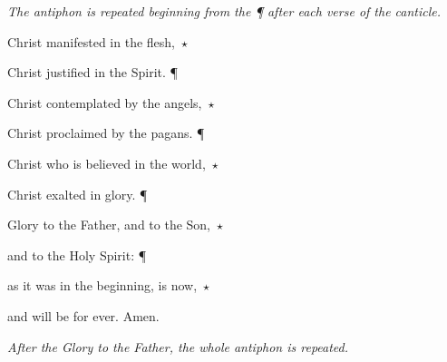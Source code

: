 \emph{The antiphon is repeated beginning from the \emph{¶} after each verse of the canticle.} \vspace{5pt}

\noindent Christ manifested in the flesh,~$\star$~\nopagebreak

Christ justified in the Spirit. ¶

\noindent Christ contemplated by the angels,~$\star$~\nopagebreak

Christ proclaimed by the pagans. ¶

\noindent Christ who is believed in the world,~$\star$~\nopagebreak

Christ exalted in glory. ¶

\noindent Glory to the Father, and to the Son,~$\star$~\nopagebreak

and to the Holy Spirit: ¶

\noindent as it was in the beginning, is now,~$\star$~\nopagebreak

and will be for ever. Amen.

\vspace{5pt} \emph{After the \emph{Glory to the Father,} the whole antiphon is repeated.}
